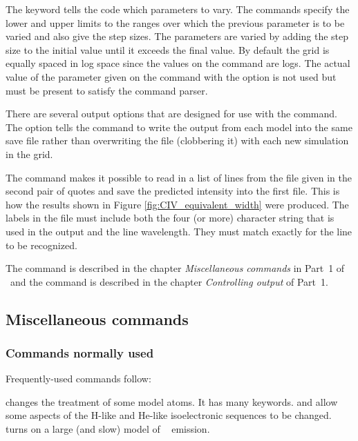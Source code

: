 \documentclass[12pt,twoside]{article}
\begin{document}
{The  keyword tells the code
which parameters to vary.  The 
commands specify the lower and upper limits to the ranges over which the
previous parameter is to be varied and also give the step sizes.  The
parameters are varied by adding the step size to the initial value until
it exceeds the final value.  By default the grid is equally spaced in log space since
the values on the  command are
logs.  The actual value of the parameter
given on the command with the 
option is not used but must be present to satisfy the command parser.

There are several output options that are designed for use
with the  command.
The  option tells the 
command to write the output from each
model into the same save file rather than overwriting the file (clobbering
it) with each new simulation in the grid.

The  command makes
it possible to read in a list of lines
from the file given in the second pair of quotes and save the predicted
intensity into the first file.
This is how the results shown in Figure \ref{fig:CIV_equivalent_width}
were produced.
The labels in the file must include both the four (or more) character
string that is used in the output and the line wavelength.  They must match
exactly for the line to be recognized.

The  command is described
in the chapter \emph{Miscellaneous commands} in
Part~1 of \Hazy\ and the  command is described in the chapter
\emph{Controlling output} of Part~1.

\subsection{Miscellaneous commands}

\subsubsection{Commands normally used}

Frequently-used commands follow:

 changes the treatment of
some model atoms.  It has many keywords.
 and 
allow some aspects of the H-like and He-like
isoelectronic sequences to be changed.  
turns on a large (and slow) model of \htwo\ \citep{Shaw2005} emission.

}
\end{document}
